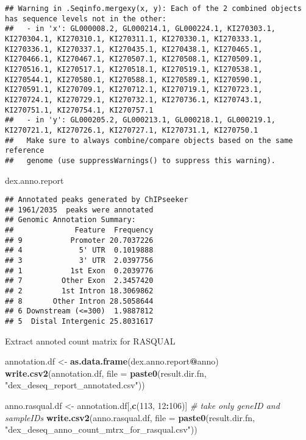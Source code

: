 \documentclass[
]{article}
\newenvironment{Shaded}{\begin{snugshade}}{\end{snugshade}}
\newcommand{\CommentTok}[1]{\textcolor[rgb]{0.56,0.35,0.01}{\textit{#1}}}
\newcommand{\DataTypeTok}[1]{\textcolor[rgb]{0.13,0.29,0.53}{#1}}
\newcommand{\DecValTok}[1]{\textcolor[rgb]{0.00,0.00,0.81}{#1}}
\newcommand{\KeywordTok}[1]{\textcolor[rgb]{0.13,0.29,0.53}{\textbf{#1}}}
\newcommand{\NormalTok}[1]{#1}
\newcommand{\OperatorTok}[1]{\textcolor[rgb]{0.81,0.36,0.00}{\textbf{#1}}}
\newcommand{\StringTok}[1]{\textcolor[rgb]{0.31,0.60,0.02}{#1}}
\begin{document}
\begin{verbatim}
## Warning in .Seqinfo.mergexy(x, y): Each of the 2 combined objects has sequence levels not in the other:
##   - in 'x': GL000008.2, GL000214.1, GL000224.1, KI270303.1, KI270304.1, KI270310.1, KI270311.1, KI270330.1, KI270333.1, KI270336.1, KI270337.1, KI270435.1, KI270438.1, KI270465.1, KI270466.1, KI270467.1, KI270507.1, KI270508.1, KI270509.1, KI270516.1, KI270517.1, KI270518.1, KI270519.1, KI270538.1, KI270544.1, KI270580.1, KI270588.1, KI270589.1, KI270590.1, KI270591.1, KI270709.1, KI270712.1, KI270719.1, KI270723.1, KI270724.1, KI270729.1, KI270732.1, KI270736.1, KI270743.1, KI270751.1, KI270754.1, KI270757.1
##   - in 'y': GL000205.2, GL000213.1, GL000218.1, GL000219.1, KI270721.1, KI270726.1, KI270727.1, KI270731.1, KI270750.1
##   Make sure to always combine/compare objects based on the same reference
##   genome (use suppressWarnings() to suppress this warning).
\end{verbatim}

\begin{Shaded}
\begin{Highlighting}[]
\NormalTok{dex.anno.report}
\end{Highlighting}
\end{Shaded}

\begin{verbatim}
## Annotated peaks generated by ChIPseeker
## 1961/2035  peaks were annotated
## Genomic Annotation Summary:
##              Feature  Frequency
## 9           Promoter 20.7037226
## 4             5' UTR  0.1019888
## 3             3' UTR  2.0397756
## 1           1st Exon  0.2039776
## 7         Other Exon  2.3457420
## 2         1st Intron 18.3069862
## 8       Other Intron 28.5058644
## 6 Downstream (<=300)  1.9887812
## 5  Distal Intergenic 25.8031617
\end{verbatim}

Extract annoted count matrix for RASQUAL

\begin{Shaded}
\begin{Highlighting}[]
\NormalTok{annotation.df   <-}\StringTok{ }\KeywordTok{as.data.frame}\NormalTok{(dex.anno.report}\OperatorTok{@}\NormalTok{anno)}
\KeywordTok{write.csv2}\NormalTok{(annotation.df, }\DataTypeTok{file =} \KeywordTok{paste0}\NormalTok{(result.dir.fn, }\StringTok{"dex_deseq_report_annotated.csv"}\NormalTok{))}

\NormalTok{anno.rasqual.df <-}\StringTok{ }\NormalTok{annotation.df[,}\KeywordTok{c}\NormalTok{(}\DecValTok{113}\NormalTok{, }\DecValTok{12}\OperatorTok{:}\DecValTok{106}\NormalTok{)] }\CommentTok{# take only geneID and sampleIDs}
\KeywordTok{write.csv2}\NormalTok{(anno.rasqual.df, }\DataTypeTok{file =} \KeywordTok{paste0}\NormalTok{(result.dir.fn, }\StringTok{"dex_deseq_anno_count_mtrx_for_rasqual.csv"}\NormalTok{))}
\end{Highlighting}
\end{Shaded}
\end{document}
